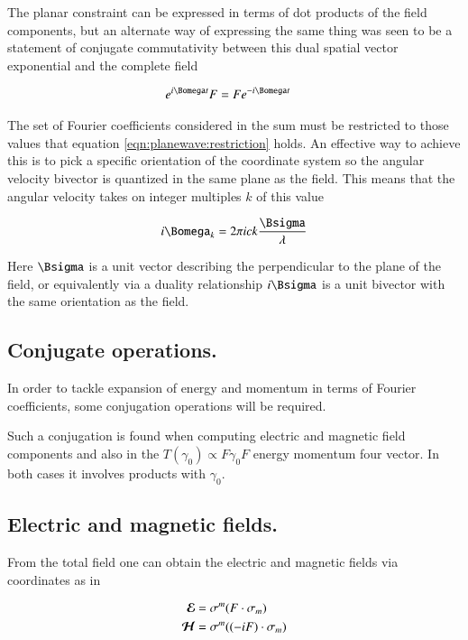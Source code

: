 The planar constraint can be expressed in terms of dot products of the field components, but an alternate way of expressing the same thing was seen to be
a statement of conjugate commutativity between this dual spatial vector exponential and the complete field

\begin{align}\label{eqn:planewave:restriction}
e^{ i \Bomega t} F &= F e^{ -i \Bomega t}
\end{align}

The set of Fourier coefficients considered in the sum must be restricted to those values that equation \ref{eqn:planewave:restriction} holds.  An effective
way to achieve this is to
pick a specific orientation of the coordinate system so the angular
velocity bivector is quantized in the same plane as the field.  This means that
the angular velocity takes on integer multiples $k$ of this value

\begin{align}
i \Bomega_k = 2 \pi i c k \frac{\Bsigma}{\lambda}
\end{align}

Here $\Bsigma$ is a unit vector describing the perpendicular to the plane of the field, or equivalently via a duality relationship $i \Bsigma$ is a unit bivector with the same orientation as the field.

\subsection{Conjugate operations. }

In order to tackle expansion of energy and momentum in terms of Fourier coefficients, some conjugation operations will be required.

Such a conjugation is found when computing electric and magnetic field components and also in the $T(\gamma_0) \propto F \gamma_0 F$ energy
momentum four vector.  In both cases it involves products with $\gamma_0$.

\subsection{Electric and magnetic fields. }

From the total field one can
obtain the electric and magnetic fields via coordinates as in

%
\begin{align*}
\boldsymbol{\mathcal{E}} &= \sigma^m (F \cdot \sigma_m) \\
\boldsymbol{\mathcal{H}} &= \sigma^m ((-i F) \cdot \sigma_m)
\end{align*}

